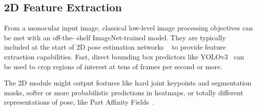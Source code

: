 \documentclass[9pt,twocolumn]{article}
\begin{document}
	\subsection{2D Feature Extraction}

		\par{From a monocular input image, classical low-level image processing objectives can be met with an off-the-
		shelf ImageNet-trained model. They are typically included at the start of 2D pose estimation networks
		~\cite{openpose-paf,openpose-cpm,nbf} to provide feature extraction capabilities. Fast, direct bounding box
		predictors like YOLOv3~\cite{yolo3} can be used to crop regions of interest at tens of frames per second or more.}

		\par{The 2D module might output features like hard joint keypoints and segmentation masks, softer or more
		probabilistic predictions in heatmaps, or totally different representations of pose, like Part Affinity Fields~\cite{openpose-paf}.}
 


{}

\end{document}
